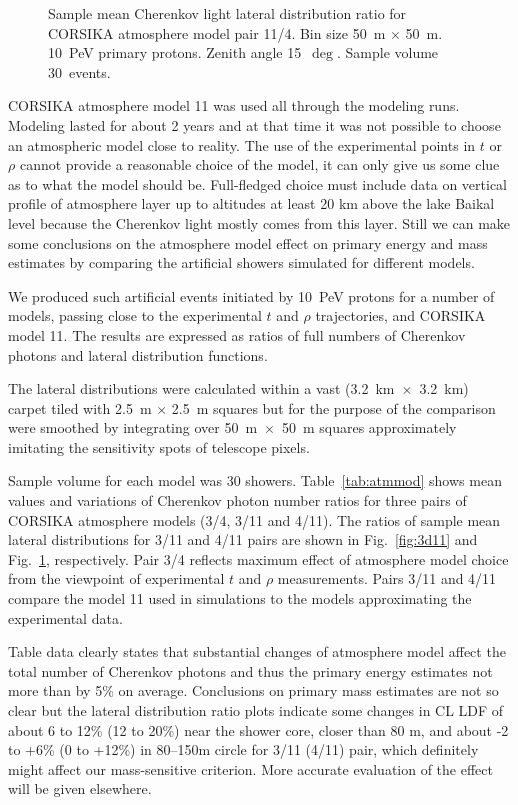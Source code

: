 \documentclass[final,5p,times,twocolumn]{elsarticle}
\begin{document}
\begin{figure}[tb]
\begin{minipage}[t]{0.48\textwidth}
    \vspace{-1.0pc}
    \caption{Sample mean Cherenkov light lateral distribution ratio for CORSIKA atmosphere model
    pair 11/4. Bin size 50~m $\times$ 50~m. 10~PeV primary protons. Zenith angle 15~$\deg$. Sample volume 30~events.}
\label{fig:4d11}
\end{minipage}
\end{figure}


CORSIKA atmosphere model 11 was used all through the modeling runs. Modeling lasted for about 2 years and at that time it was not possible to choose an atmospheric model close to reality. The use of the experimental points in $t$ or $\rho$ cannot provide a reasonable  choice of the model, it can only give us some clue as to what the model should be. Full-fledged choice must include data on vertical profile of atmosphere layer up to altitudes at least 20 km above the lake Baikal level because the Cherenkov light mostly comes from this layer. Still we can make some conclusions on the atmosphere model effect on primary energy and mass estimates by comparing the artificial showers simulated for different models.

We produced such artificial events initiated by 10~PeV protons for a number of models, passing close to the experimental $t$ and $\rho$ trajectories, and CORSIKA model 11. The results are expressed as ratios of full numbers of Cherenkov photons and lateral distribution functions.

The lateral distributions were calculated within a vast (3.2~km~$\times$~3.2~km) carpet tiled with 2.5~m $\times$ 2.5~m squares but for the purpose of the comparison were smoothed by integrating over 50~m~$\times$~50~m squares approximately imitating the sensitivity spots of telescope pixels.

Sample volume for each model was 30 showers. Table~\ref{tab:atmmod} shows mean values and variations of Cherenkov photon number ratios for three pairs of CORSIKA atmosphere models (3/4, 3/11 and 4/11). The ratios of sample mean lateral distributions for 3/11 and 4/11 pairs are shown in Fig.~\ref{fig:3d11} and Fig.~\ref{fig:4d11}, respectively. Pair 3/4 reflects maximum effect of atmosphere model choice from the viewpoint of experimental $t$ and $\rho$ measurements. Pairs 3/11 and 4/11 compare the model 11 used in simulations to the models approximating the experimental data.

Table data clearly states that substantial changes of atmosphere model affect the total number of Cherenkov photons and thus the primary energy estimates not more than by 5\% on average. Conclusions on primary mass estimates are not so clear but the lateral distribution ratio plots indicate some changes in CL LDF of about 6 to 12\% (12 to 20\%) near the shower core, closer than 80 m, and about -2 to +6\% (0 to +12\%) in 80--150m circle for 3/11 (4/11) pair, which definitely might affect our mass-sensitive criterion. More accurate evaluation of the effect will be given elsewhere.
\end{document}
